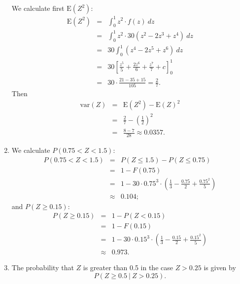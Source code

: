\documentclass[12pt,thmsa]{article}\usepackage[]{graphicx}\usepackage[]{color}
\begin{document}
\begin{enumerate}
We calculate first $\text{E}(Z^2)$:
  \begin{eqnarray*}
     \text{E}(Z^2) &=& \int_0^1 z^2 \cdot f(z) \ dz \\
    &=& \int_0^1 z^2 \cdot 30(z^2 - 2z^3 + z^4) \ dz \\
    &=& 30 \int_0^1 (z^4-2z^5+z^6) \ dz \\
    &=& 30 \left[ \frac{z^5}{5} + \frac{2z^6}{6} + \frac{z^7}{7} + c
      \right]_0^1  \\
    &=& 30 \cdot \frac{21-35+15}{105} = \frac{2}{7}.
  \end{eqnarray*}
  Then
  \begin{eqnarray*}
     \text{var}(Z) &=& \text{E}(Z^2)-\text{E}(Z)^2 \\
    &=& \frac{2}{7} - \left( \frac{1}{2} \right)^2 \\
    &=& \frac{8-7}{28} \approx {0.0357}.
  \end{eqnarray*}

\item We calculate $P(0.75 < Z < 1.5)$:
  \begin{eqnarray*}
    P(0.75 < Z < 1.5) &=& P(Z \le 1.5) -P(Z \le 0.75) \\
    &=& 1 - F(0.75) \\
    &=& 1 - 30 \cdot 0.75^3 \cdot \left( \frac{1}{3} - \frac{0.75}{2} +
      \frac{0.75^2}{5} \right) \\
    &\approx& {0.104};
  \end{eqnarray*}
   and $P(Z \ge 0.15)$:
   \begin{eqnarray*}
     P(Z \ge 0.15) &=& 1-P(Z < 0.15) \\
     &=& 1-F(0.15) \\
     &=& 1- 30 \cdot 0.15^3 \cdot \left( \frac{1}{3} - \frac{0.15}{2} +
      \frac{0.15^2}{5} \right) \\
    &\approx& {0.973}.
   \end{eqnarray*}
%
%
 \item The probability that $Z$ is greater than 0.5 in the case $Z > 0.25$
  is given by
$$P ( Z \ge 0.5 \ | \ Z > 0.25).$$


\end{enumerate}
\end{document}
